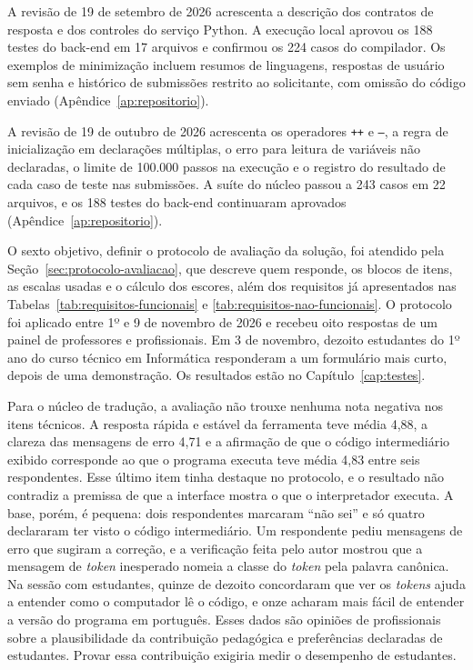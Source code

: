 A revisão de 19 de setembro de 2026 acrescenta a descrição dos contratos de resposta e dos controles do serviço Python. A execução local aprovou os 188 testes do back-end em 17 arquivos e confirmou os 224 casos do compilador. Os exemplos de minimização incluem resumos de linguagens, respostas de usuário sem senha e histórico de submissões restrito ao solicitante, com omissão do código enviado (Apêndice~\ref{ap:repositorio}).

A revisão de 19 de outubro de 2026 acrescenta os operadores \texttt{++} e \texttt{--}, a regra de inicialização em declarações múltiplas, o erro para leitura de variáveis não declaradas, o limite de 100.000 passos na execução e o registro do resultado de cada caso de teste nas submissões. A suíte do núcleo passou a 243 casos em 22 arquivos, e os 188 testes do back-end continuaram aprovados (Apêndice~\ref{ap:repositorio}).

O sexto objetivo, definir o protocolo de avaliação da solução, foi atendido pela Seção~\ref{sec:protocolo-avaliacao}, que descreve quem responde, os blocos de itens, as escalas usadas e o cálculo dos escores, além dos requisitos já apresentados nas Tabelas~\ref{tab:requisitos-funcionais} e \ref{tab:requisitos-nao-funcionais}. O protocolo foi aplicado entre 1º e 9 de novembro de 2026 e recebeu oito respostas de um painel de professores e profissionais. Em 3 de novembro, dezoito estudantes do 1º ano do curso técnico em Informática responderam a um formulário mais curto, depois de uma demonstração. Os resultados estão no Capítulo~\ref{cap:testes}.

Para o núcleo de tradução, a avaliação não trouxe nenhuma nota negativa nos itens técnicos. A resposta rápida e estável da ferramenta teve média 4,88, a clareza das mensagens de erro 4,71 e a afirmação de que o código intermediário exibido corresponde ao que o programa executa teve média 4,83 entre seis respondentes. Esse último item tinha destaque no protocolo, e o resultado não contradiz a premissa de que a interface mostra o que o interpretador executa. A base, porém, é pequena: dois respondentes marcaram ``não sei'' e só quatro declararam ter visto o código intermediário. Um respondente pediu mensagens de erro que sugiram a correção, e a verificação feita pelo autor mostrou que a mensagem de \textit{token} inesperado nomeia a classe do \textit{token} pela palavra canônica. Na sessão com estudantes, quinze de dezoito concordaram que ver os \textit{tokens} ajuda a entender como o computador lê o código, e onze acharam mais fácil de entender a versão do programa em português. Esses dados são opiniões de profissionais sobre a plausibilidade da contribuição pedagógica e preferências declaradas de estudantes. Provar essa contribuição exigiria medir o desempenho de estudantes.

